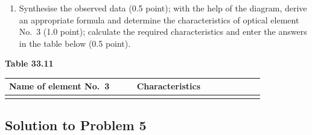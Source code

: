 \begin{enumerate}[label=(\arabic*),start=7]
\item Synthesise the observed data (0.5 point); with the help of the diagram, derive an appropriate formula and determine the characteristics of optical element No.~3 (1.0 point); calculate the required characteristics and enter the answers in the table below (0.5 point).
\end{enumerate}

\begin{center}
\small\textbf{Table 33.11}
\end{center}
\begin{center}
\begin{tabular}{|p{0.42\linewidth}|p{0.42\linewidth}|}
\hline
\centering Name of element No.~3 & \centering\arraybackslash Characteristics \tabularnewline
\hline
\rule{0pt}{1.6cm} & \tabularnewline
\hline
\end{tabular}
\end{center}

\subsection*{Solution to Problem 5}

